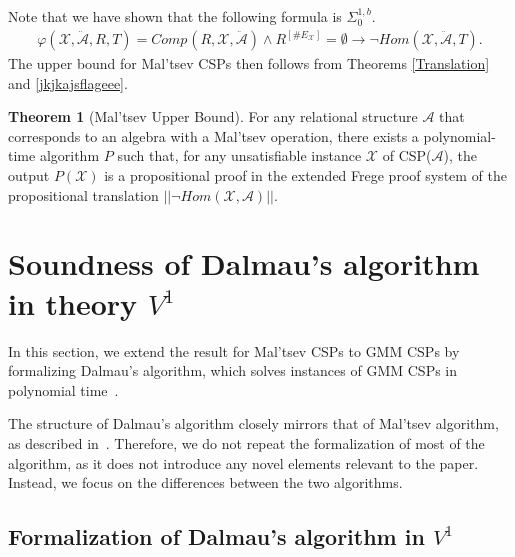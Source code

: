 \documentclass{article}
\theoremstyle{definition}
\theoremstyle{theorem}
\newtheorem{thm}{Theorem}
\theoremstyle{theorem}
\theoremstyle{remark}
\theoremstyle{remark}
\theoremstyle{example}
\theoremstyle{notation}
\theoremstyle{theorem}
\begin{document}
Note that we have shown that the following formula is $\Sigma^{1,b}_0$.
\begin{equation}
    \begin{gathered}
        \varphi(\mathcal{X} ,\ddot{\mathcal{A}}, R, T ) = Comp_{}(R,\mathcal{X},\ddot{\mathcal{A}})\wedge  R^{[\#E_{\mathcal{X}}]}=\emptyset \longrightarrow \neg Hom(\mathcal{X},\ddot{\mathcal{A}}, T).
    \end{gathered}
\end{equation}
The upper bound for Mal'tsev CSPs then follows from Theorems \ref{Translation} and \ref{jkjkajsflageee}. 

\begin{thm}[Mal'tsev Upper Bound]
For any relational structure $\mathcal{A}$ that corresponds to an algebra with a Mal'tsev operation, there exists a polynomial-time algorithm $P$ such that, for any unsatisfiable instance $\mathcal{X}$ of CSP($\mathcal{A}$), the output $P(\mathcal{X})$ is a propositional proof in the extended Frege proof system of the propositional translation $||\neg Hom(\mathcal{X}, \mathcal{A})||$.
\end{thm}



\section{Soundness of Dalmau's algorithm in theory $V^1$}\label{alskdyf;kajdsghy;kgj}

In this section, we extend the result for Mal'tsev CSPs to GMM CSPs by formalizing Dalmau's algorithm, which solves instances of GMM CSPs in polynomial time~\cite{lmcs:2237}.

The structure of Dalmau's algorithm closely mirrors that of Mal'tsev algorithm, as described in~\cite{lmcs:2237}. Therefore, we do not repeat the formalization of most of the algorithm, as it does not introduce any novel elements relevant to the paper. Instead, we focus on the differences between the two algorithms.
 


\subsection{Formalization of Dalmau's algorithm in $V^1$}\label{aorgj['aigh'a]}
\end{document}
